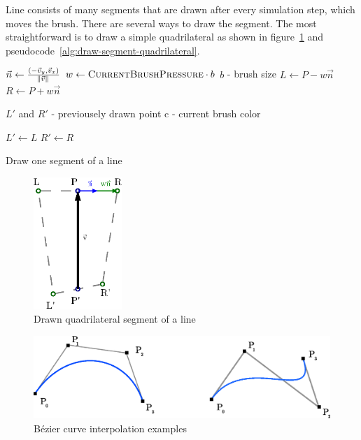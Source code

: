 Line consists of many segments that are drawn after every simulation step, which moves the brush. There are several ways to draw the segment. The most straightforward is to draw a simple quadrilateral as shown in figure~\ref{fig:draw-segment-quadrilateral} and pseudocode~\ref{alg:draw-segment-quadrilateral}.

\begin{pseudocode}
	\begin{algorithmic}
              \State $ \vec{n} \gets \frac{(-\vec{v}_y, \vec{v}_x)}{\norm{\vec{v}}} $        
              \State $ w \gets \Call{CurrentBrushPressure}{} \cdot b $ \Comment $b$ - brush size
              \State $L \gets P - w\vec{n}$
              \State $R \gets P + w\vec{n}$

              \State {}
              \State {} \Comment $L'$ and $R'$ - previousely drawn point
              \State {}
              \State {}
              \State {}
              \State {}
              \State {} \Comment c - current brush color

              \State $L' \gets L$
              \State $R' \gets R$
          \EndFunction
       \end{algorithmic}
  	   \caption{Draw one segment of a line}
      \label{alg:draw-segment-quadrilateral}
   \end{pseudocode}

   
  \begin{figure}
  	\centering
      \includegraphics[height=50mm]{../img/draw-segment-quadrilateral.eps}
      \caption{Drawn quadrilateral segment of a line}
      \label{fig:draw-segment-quadrilateral}
  \end{figure}


\begin{figure}
	\centering
  		\includegraphics[width=130mm]{../img/bezier_curves.eps}
  		\caption{Bézier curve interpolation examples}
  		\label{fig:bezier-curve}
\end{figure}

